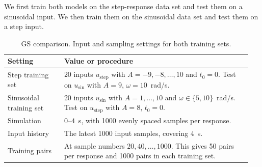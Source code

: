 \textcolor{examineredit}{We first train both models on the step-response data set and test them on a sinusoidal input. We then train them on the sinusoidal data set and test them on a step input.}

\begin{table}[H]
    \centering
    \color{examineredit}
    \small
    \renewcommand{\arraystretch}{1.15}
    \caption{\textcolor{examineredit}{GS comparison. Input and sampling settings for both training sets.}}
    \label{tab:kernel-gs-settings}
    \begin{tabular}{@{}p{0.22\linewidth}p{0.73\linewidth}@{}}
        \toprule
        Setting & Value or procedure \\
        \midrule
        Step training set & 20 inputs \(u_{\mathrm{step}}\) with \(A=-9,-8,\ldots,10\) and \(t_0=0\). Test on \(u_{\mathrm{sin}}\) with \(A=9\), \(\omega=10\)~rad/s. \\[4pt]
        Sinusoidal training set & 20 inputs \(u_{\mathrm{sin}}\) with \(A=1,\ldots,10\) and \(\omega\in\{5,10\}\)~rad/s. Test on \(u_{\mathrm{step}}\) with \(A=8\), \(t_0=0\). \\[4pt]
        Simulation & \(0\)--\(4\)~s, with 1000 evenly spaced samples per response. \\[4pt]
        Input history & The latest 1000 input samples, covering \(4\)~s. \\[4pt]
        Training pairs & At sample numbers \(20,40,\ldots,1000\). This gives 50 pairs per response and 1000 pairs in each training set. \\
        \bottomrule
    \end{tabular}
\end{table}


